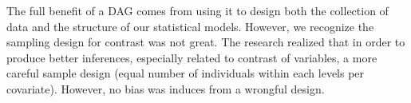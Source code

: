 The full benefit of a DAG comes from using it to design both the collection of data and the structure of our statistical models. However, we recognize the sampling design for contrast was not great. The research realized that in order to produce better inferences, especially related to contrast of variables, a more careful sample design (equal number of individuals within each levels per covariate). However, no bias was induces from a wrongful design.
